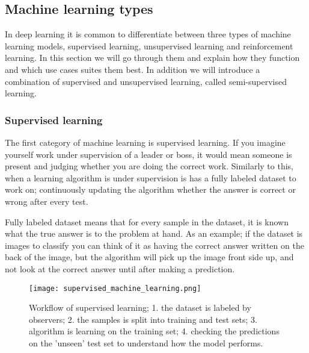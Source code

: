 \documentclass[thesis.tex]{subfiles}
\begin{document}
\subsection{Machine learning types} \label{sec:machine_learning_types}
In deep learning it is common to differentiate between three types of machine learning models, supervised learning, unsupervised learning and reinforcement learning. In this section we will go through them and explain how they function and which use cases suites them best. In addition we will introduce a combination of supervised and unsupervised learning, called semi-supervised learning.


\subsubsection{Supervised learning} \label{sec:supervised_learnign}
The first category of machine learning is supervised learning. If you imagine yourself work under supervision of a leader or boss, it would mean someone is present and judging whether you are doing the correct work. Similarly to this, when a learning algorithm is under supervision is has a fully labeled dataset to work on; continuously updating the algorithm whether the answer is correct or wrong after every test.

Fully labeled dataset means that for every sample in the dataset, it is known what the true answer is to the problem at hand. As an example; if the dataset is images to classify you can think of it as having the correct answer written on the back of the image, but the algorithm will pick up the image front side up, and not look at the correct answer until after making a prediction.

\begin{figure}[h] %
  \begin{center}
    \texttt{[image: supervised\_machine\_learning.png]}
    \caption[Workflow of supervised machine learning.]{Workflow of supervised learning; 1. the dataset is labeled by observers; 2. the samples is split into training and test sets; 3. algorithm is learning on the training set; 4. checking the predictions on the 'unseen' test set to understand how the model performs.}
    \label{fig:supervised_machine_learning}
  \end{center}
\end{figure}
\end{document}
